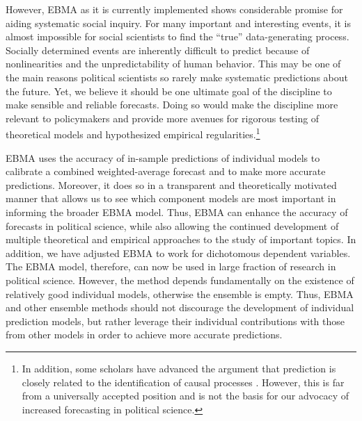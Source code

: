 \documentclass[12pt,fullpage,endnotes]{article}
\newcommand{\note}[1]{\footnote{ #1 \vspace{4 mm}}}
\begin{document}
However, EBMA as it is currently implemented shows considerable
promise for aiding systematic social inquiry.  For many important and
interesting events, it is almost impossible for social scientists to
find the ``true'' data-generating process.  Socially determined events
are inherently difficult to predict because of nonlinearities and the
unpredictability of human behavior.  This may be one of the main
reasons political scientists so rarely make systematic predictions
about the future. Yet, we believe it should be one ultimate goal of
the discipline to make sensible and reliable forecasts.  Doing so
would make the discipline more relevant to policymakers and provide
more avenues for rigorous testing of theoretical models and
hypothesized empirical regularities.\note{In addition, some scholars
  have advanced the argument that prediction is closely related to the
  identification of causal processes \citep[e.g.,][]{Spirtes:2000}.
  However, this is far from a universally accepted position and is not
  the basis for our advocacy of increased forecasting in political
  science.}

EBMA uses the accuracy of in-sample predictions of individual models
to calibrate a combined weighted-average forecast and to make more
accurate predictions.  Moreover, it does so in a transparent and
theoretically motivated manner that allows us to see which component
models are most important in informing the broader EBMA model.  Thus,
EBMA can enhance the accuracy of forecasts in political science, while
also allowing the continued development of multiple theoretical and
empirical approaches to the study of important topics. In addition, we
have adjusted EBMA to work for dichotomous dependent variables.  The
EBMA model, therefore, can now be used in large fraction of research
in political science. However, the method depends fundamentally on the
existence of relatively good individual models, otherwise the ensemble
is empty. Thus, EBMA and other ensemble methods should not discourage
the development of individual prediction models, but rather leverage
their individual contributions with those from other models in order
to achieve more accurate predictions.
\end{document}
